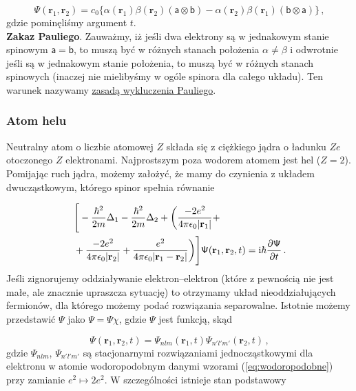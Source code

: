 \documentclass{myclass}
\begin{document}
\begin{equation*}
\mathsf{\Psi}(\mathbf{r}_1,\mathbf{r}_2)=c_0\bigg\{\alpha(\mathbf{r}_1)\beta(\mathbf{r}_2)(\mathsf{a}\otimes\mathsf{b})-\alpha(\mathbf{r}_2)\beta(\mathbf{r}_1)(\mathsf{b}\otimes\mathsf{a})\bigg\}\,,
\end{equation*}
gdzie pominęliśmy argument \(t\).\\

\textbf{Zakaz Pauliego}. Zauważmy, iż jeśli dwa elektrony są w jednakowym stanie spinowym
\(\mathsf{a}=\mathsf{b}\), to muszą być w różnych stanach położenia \(\alpha\neq\beta\) i odwrotnie
jeśli są w jednakowym stanie położenia, to muszą być w różnych stanach spinowych (inaczej nie
mielibyśmy w ogóle spinora dla całego układu). Ten warunek nazywamy \underline{zasadą wykluczenia
Pauliego}.

\subsubsection{Atom helu}

Neutralny atom o liczbie atomowej \(Z\) składa się z ciężkiego jądra o ładunku \(Ze\) otoczonego
\(Z\) elektronami. Najprostszym poza wodorem atomem jest hel (\(Z=2\)). Pomijając ruch jądra, możemy
założyć, że mamy do czynienia z układem dwucząstkowym, którego spinor spełnia równanie

\begin{equation*}
\begin{split}
&\Bigg[-\frac{\hbar^2}{2m}\Delta_1-\frac{\hbar^2}{2m}\Delta_2+\bigg(\frac{-2e^2}{4\pi\epsilon_0|\mathbf{r}_1|}+\\
&+\frac{-2e^2}{4\pi\epsilon_0|\mathbf{r}_2|}+\frac{e^2}{4\pi\epsilon_0|\mathbf{r}_1-\mathbf{r}_2|}\bigg)\Bigg]\mathsf{\Psi}(\mathbf{r}_1,\mathbf{r}_2,t)=\mathrm{i}\hbar\pdv{\mathsf{\Psi}}{t}\,.
\end{split}
\end{equation*}
Jeśli zignorujemy oddziaływanie elektron--elektron (które z pewnością nie jest małe, ale znacznie
upraszcza sytuację) to otrzymamy układ nieoddziałujących fermionów, dla którego możemy podać
rozwiązania separowalne. Istotnie możemy przedstawić \(\mathsf{\Psi}\) jako
\(\mathsf{\Psi}=\Psi\chi\), gdzie \(\Psi\) jest funkcją, skąd

\begin{equation*}
\Psi(\mathbf{r}_1,\mathbf{r}_2,t)=\Psi_{nlm}(\mathbf{r}_1,t)\Psi_{n'l'm'}(\mathbf{r}_2,t)\,,
\end{equation*}
gdzie \(\Psi_{nlm}\), \(\Psi_{n'l'm'}\) są stacjonarnymi rozwiązaniami jednocząstkowymi dla
elektronu w atomie wodoropodobnym danymi wzorami (\ref{eq:wodoropodobne}) przy zamianie
\(e^2\mapsto2e^2\). W szczególności istnieje stan podstawowy
\end{document}
